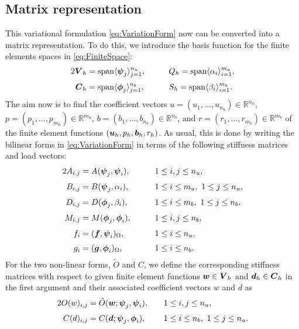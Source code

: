 \subsection{Matrix representation}

This variational formulation \eqref{eq:VariationForm} now can be converted into a matrix representation. To do this, we introduce the basis function for the finite elements spaces in \eqref{eq:FiniteSpace}:
\begin{alignat}2
\label{eq:bases1}
\uu{V}_h & = \mbox{span}\langle  \uu{\psi}_j \rangle _{j=1}^{n_u}, & \qquad &
Q_h  = \mbox{span} \langle  \alpha_i \rangle _{i=1}^{m_u},\\[0.1cm]
 \uu{C}_h& =\mbox{span}\langle \uu{\phi}_j \rangle _{j=1}^{n_b}, & \qquad & S_h = \mbox{span} \langle \beta_i
\rangle_{i=1}^{m_b}.
\end{alignat}
The aim now is to find the coefficient vectors $u = (u_1, \ldots , u_{n_u}) \in \mathbb{R}^{n_u}$, $p = (p_1, \ldots , p_{m_u}) \in \mathbb{R}^{m_u}$, $b = (b_1, \ldots , b_{n_b}) \in \mathbb{R}^{n_b}$, and $r = (r_1, \ldots , r_{m_b}) \in \mathbb{R}^{m_b}$ of the finite element functions $(\boldsymbol u_h, p_h,\boldsymbol b_h, r_h)$. As usual, this is done by writing the bilinear forms in \eqref{eq:VariationForm} in terms of the following stiffness matrices and load vectors:
\begin{alignat*}2
A_{i,j} &= A(\uu{\psi}_j,\uu{\psi}_i), &\quad  &1 \leq i,j \leq n_u,\\[0.1cm]
B_{i,j} &= B(\uu{\psi}_j,\alpha_i), &\quad &1 \leq i \leq m_u, \ 1 \leq j \leq n_u,\\[.1cm]
D_{i,j} &= D(\uu{\phi}_j,\beta_i),  & & 1 \leq i \leq m_b,\ 1 \leq j \leq n_b,\\[.1cm]
M_{i,j}&= M(\uu{\phi}_j,\uu{\phi}_i), &\qquad & 1 \leq i,j \leq n_b,\\[.1cm]
f_i &= (\uu{f},\uu{\psi}_i)_\Omega, & & 1\leq i\leq n_u,\\[.1cm]
g_i &= (\uu{g},\uu{\phi}_i)_\Omega, & & 1\leq i \leq n_b.
\end{alignat*}
For the two non-linear forms, $\tilde{O}$ and $C$, we define the corresponding stiffness matrices with respect to given finite element functions $\boldsymbol w \in \boldsymbol V_h$ and $\boldsymbol d_h\in \boldsymbol C_h$ in the first argument and their associated coefficient vectors $w$ and $d$ as
\begin{alignat*}2
O(w)_{i,j} &=\tilde{O}(\uu{w};\uu{\psi}_j,\uu{\psi}_i), &\quad  &1 \leq i,j \leq n_u,\\[.1cm]
C(d)_{i,j} &= C(\uu{d};\uu{\psi}_j,\uu{\phi}_i), & & 1\leq i \leq n_b,\ 1 \leq j \leq n_u.
\end{alignat*}

